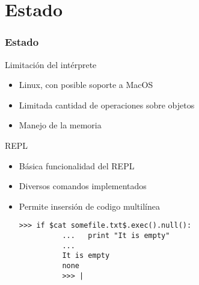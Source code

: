 \section{Estado}
\begin{frame}
  \frametitle{Estado}
  \begin{center}
    Limitación del intérprete
    \begin{itemize}
      \item Linux, con posible soporte a MacOS
      \item Limitada cantidad de operaciones sobre objetos
      \item Manejo de la memoria
    \end{itemize}
  \end{center}

  \framebreak{}
  \begin{center}
    REPL
    \begin{itemize}
      \item Básica funcionalidad del REPL
      \item Diversos comandos implementados
      \item Permite insersión de codigo multilínea
        \begin{lstlisting}[language=scriptflow]
          >>> if $cat somefile.txt$.exec().null():
          ...   print "It is empty"
          ...
          It is empty
          none
          >>> |
        \end{lstlisting}
    \end{itemize}
  \end{center}


\end{frame}
